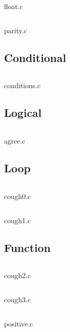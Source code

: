 \begin{listing}[ht!]
	\inputminted[linenos]{c}{codes/float.c}
	\caption{float.c}
\end{listing}

\begin{listing}[ht!]
	\inputminted[linenos]{c}{codes/parity.c}
	\caption{parity.c}
\end{listing}

\clearpage
\subsection{Conditional}
\begin{listing}[ht!]
	\inputminted[linenos]{c}{codes/conditions.c}
	\caption{conditions.c}
\end{listing}

\clearpage
\subsection{Logical}
\begin{listing}[ht!]
	\inputminted[linenos]{c}{codes/agree.c}
	\caption{agree.c}
\end{listing}

\clearpage
\subsection{Loop}
\begin{listing}[ht!]
	\inputminted[linenos]{c}{codes/src1/cough0.c}
	\caption{cough0.c}
\end{listing}

\begin{listing}[ht!]
	\inputminted[linenos]{c}{codes/src1/cough1.c}
	\caption{cough1.c}
\end{listing}

\clearpage
\subsection{Function}
\begin{listing}[ht!]
	\inputminted[linenos]{c}{codes/src1/cough2.c}
	\caption{cough2.c}
\end{listing}

\begin{listing}[ht!]
	\inputminted[linenos]{c}{codes/src1/cough3.c}
	\caption{cough3.c}
\end{listing}

\begin{listing}[ht!]
	\inputminted[linenos]{c}{codes/src1/positive.c}
	\caption{positive.c}
\end{listing}

